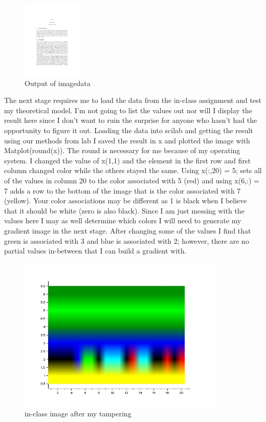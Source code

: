 \begin{figure}
\centering
\includegraphics[height=10em]{Lab2}
\caption{Output of imagedata}
\end{figure}

The next stage requires me to load the data from the in-class assignment and test my theoretical model. I'm not going to list the values out nor will I display the result here since I don't want to ruin the surprise for anyone who hasn't had the opportunity to figure it out. Loading the data into scilab and getting the result using our methods from lab I saved the result in x and plotted the image with Matplot(round(x)). The round is necessary for me because of my operating system. I changed the value of x(1,1) and the element in the first row and first column changed color while the others stayed the same. Using x(:,20) = 5; sets all of the values in column 20 to the color associated with 5 (red) and using x(6,:) = 7 adds a row to the bottom of the image that is the color associated with 7 (yellow). Your color associations may be different as 1 is black when I believe that it should be white (zero is also black). Since I am just messing with the values here I may as well determine which colors I will need to generate my gradient image in the next stage. After changing some of the values I find that green is associated with 3 and blue is associated with 2; however, there are no partial values in-between that I can build a gradient with.

\begin{figure}
\centering
\includegraphics[height=20em]{lab2b}
\caption{in-class image after my tampering}
\end{figure}

